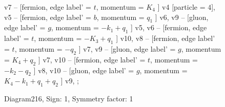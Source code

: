 \documentclass{revtex4}
\begin{document}
\begin{figure}[!htb]
\begin{center}
{v7 -- [fermion, edge label' = \(t\), momentum = \(K_{4}\) ] v4 [particle = \(4\)], 
v5 -- [fermion, edge label' = \(b\), momentum = \(q_{1}\) ] v6, 
v9 -- [gluon, edge label' = \(g\), momentum = \(-k_{1} + q_{1}\) ] v5, 
v6 -- [fermion, edge label' = \(t\), momentum = \(-K_{3} + q_{1}\) ] v10, 
v8 -- [fermion, edge label' = \(t\), momentum = \(-q_{2}\) ] v7, 
v9 -- [gluon, edge label' = \(g\), momentum = \(K_{4} + q_{2}\) ] v7, 
v10 -- [fermion, edge label' = \(t\), momentum = \(-k_{2} - q_{2}\) ] v8, 
v10 -- [gluon, edge label' = \(g\), momentum = \(K_{4} - k_{1} + q_{1} + q_{2}\) ] v9, 
};
\end{center}
\caption{Diagram216, Sign: 1, Symmetry factor: 1}
\end{figure}
\newpage
\end{document}
